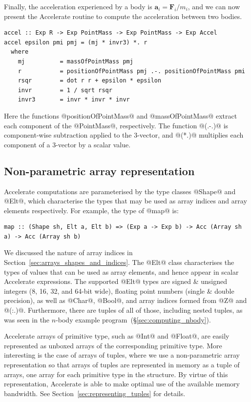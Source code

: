Finally, the acceleration experienced by a body is $\mathbf{a}_i =
\mathbf{F}_i/m_i$, and we can now present the Accelerate routine to compute the
acceleration between two bodies.
%
%
%
\begin{lstlisting}[style=haskell]
accel :: Exp R -> Exp PointMass -> Exp PointMass -> Exp Accel
accel epsilon pmi pmj = (mj * invr3) *. r
  where
    mj          = massOfPointMass pmj
    r           = positionOfPointMass pmj .-. positionOfPointMass pmi
    rsqr        = dot r r + epsilon * epsilon
    invr        = 1 / sqrt rsqr
    invr3       = invr * invr * invr
\end{lstlisting}
%
Here the functions @positionOfPointMass@ and @massOfPointMass@ extract each
component of the @PointMass@, respectively. The function @(.-.)@ is
component-wise subtraction applied to the 3-vector, and @(*.)@ multiplies each
component of a 3-vector by a scalar value.


\subsection{Non-parametric array representation}

Accelerate computations are parameterised by the type classes @Shape@ and @Elt@,
which characterise the types that may be used as array indices and array
elements respectively. For example, the type of @map@ is:
%
\begin{lstlisting}[style=haskell]
map :: (Shape sh, Elt a, Elt b) => (Exp a -> Exp b) -> Acc (Array sh a) -> Acc (Array sh b)
\end{lstlisting}
%
We discussed the nature of array
indices in Section~\ref{sec:arrays_shapes_and_indices}. The @Elt@ class
characterises the types of values that can be used as array elements, and hence
appear in scalar Accelerate expressions. The supported @Elt@ types are signed \&
unsigned integers (8, 16, 32, and 64-bit wide), floating point numbers (single
\& double precision), as well as @Char@, @Bool@, and array indices formed from
@Z@ and @(:.)@. Furthermore, there are tuples of all of those,
including nested tuples, as was seen in the $n$-body example
program~(\S\ref{sec:computing_nbody}).

Accelerate arrays of primitive type, such as @Int@ and @Float@, are easily
represented as unboxed arrays of the corresponding primitive type. More
interesting is the case of arrays of tuples, where we use a
non-parametric array representation so that
arrays of tuples are represented in memory as a tuple of arrays, one array for
each primitive type in the structure. By virtue of this representation,
Accelerate is able to make optimal use of the available memory bandwidth. See
Section~\ref{sec:representing_tuples} for details.

